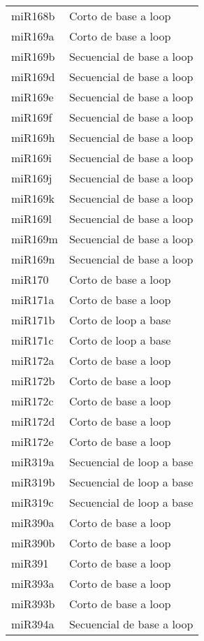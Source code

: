 \begin{table}[htbp!]
\begin{tabular}{ll}
miR168b        & Corto de base a loop      \\
miR169a        & Corto de base a loop      \\
miR169b        & Secuencial de base a loop \\
miR169d        & Secuencial de base a loop \\
miR169e        & Secuencial de base a loop \\
miR169f        & Secuencial de base a loop \\
miR169h        & Secuencial de base a loop \\
miR169i        & Secuencial de base a loop \\
miR169j        & Secuencial de base a loop \\
miR169k        & Secuencial de base a loop \\
miR169l        & Secuencial de base a loop \\
miR169m        & Secuencial de base a loop \\
miR169n        & Secuencial de base a loop \\
miR170         & Corto de base a loop      \\
miR171a        & Corto de base a loop      \\
miR171b        & Corto de loop a base      \\
miR171c        & Corto de loop a base      \\
miR172a        & Corto de base a loop      \\
miR172b        & Corto de base a loop      \\
miR172c        & Corto de base a loop      \\
miR172d        & Corto de base a loop      \\
miR172e        & Corto de base a loop      \\
miR319a        & Secuencial de loop a base \\
miR319b        & Secuencial de loop a base \\
miR319c        & Secuencial de loop a base \\
miR390a        & Corto de base a loop      \\
miR390b        & Corto de base a loop      \\
miR391         & Corto de base a loop      \\
miR393a        & Corto de base a loop      \\
miR393b        & Corto de base a loop      \\
miR394a        & Secuencial de base a loop \\

\end{tabular}
\end{table}

